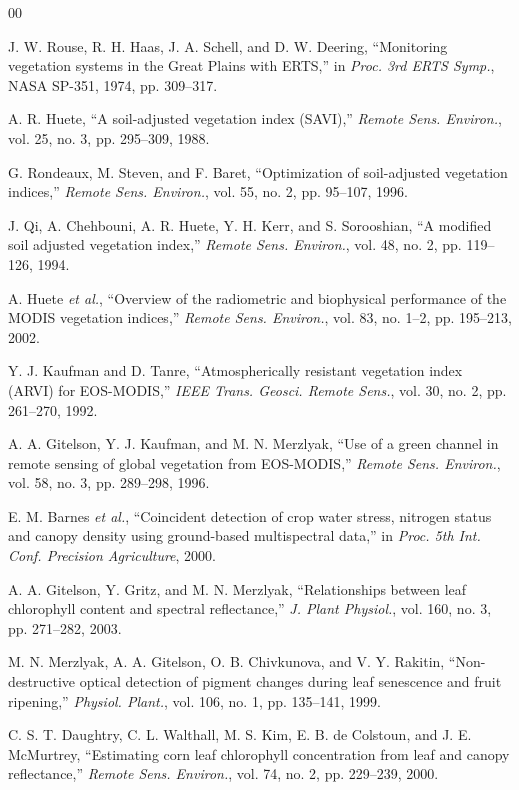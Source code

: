 \documentclass[conference]{IEEEtran}
\begin{document}
\begin{thebibliography}{00}

 J. W. Rouse, R. H. Haas, J. A. Schell, and D. W. Deering,
``Monitoring vegetation systems in the Great Plains with ERTS,'' in
\emph{Proc. 3rd ERTS Symp.}, NASA SP-351, 1974, pp. 309--317.

 A. R. Huete, ``A soil-adjusted vegetation index (SAVI),''
\emph{Remote Sens. Environ.}, vol. 25, no. 3, pp. 295--309, 1988.

 G. Rondeaux, M. Steven, and F. Baret, ``Optimization of
soil-adjusted vegetation indices,'' \emph{Remote Sens. Environ.}, vol. 55,
no. 2, pp. 95--107, 1996.

 J. Qi, A. Chehbouni, A. R. Huete, Y. H. Kerr, and
S. Sorooshian, ``A modified soil adjusted vegetation index,''
\emph{Remote Sens. Environ.}, vol. 48, no. 2, pp. 119--126, 1994.

 A. Huete \emph{et al.}, ``Overview of the radiometric and
biophysical performance of the MODIS vegetation indices,''
\emph{Remote Sens. Environ.}, vol. 83, no. 1--2, pp. 195--213, 2002.

 Y. J. Kaufman and D. Tanre, ``Atmospherically resistant
vegetation index (ARVI) for EOS-MODIS,'' \emph{IEEE Trans. Geosci. Remote
Sens.}, vol. 30, no. 2, pp. 261--270, 1992.

 A. A. Gitelson, Y. J. Kaufman, and M. N. Merzlyak, ``Use
of a green channel in remote sensing of global vegetation from EOS-MODIS,''
\emph{Remote Sens. Environ.}, vol. 58, no. 3, pp. 289--298, 1996.

 E. M. Barnes \emph{et al.}, ``Coincident detection of crop
water stress, nitrogen status and canopy density using ground-based
multispectral data,'' in \emph{Proc. 5th Int. Conf. Precision Agriculture},
2000.

 A. A. Gitelson, Y. Gritz, and M. N. Merzlyak,
``Relationships between leaf chlorophyll content and spectral reflectance,''
\emph{J. Plant Physiol.}, vol. 160, no. 3, pp. 271--282, 2003.

 M. N. Merzlyak, A. A. Gitelson, O. B. Chivkunova, and
V. Y. Rakitin, ``Non-destructive optical detection of pigment changes during
leaf senescence and fruit ripening,'' \emph{Physiol. Plant.}, vol. 106, no. 1,
pp. 135--141, 1999.

 C. S. T. Daughtry, C. L. Walthall, M. S. Kim,
E. B. de Colstoun, and J. E. McMurtrey, ``Estimating corn leaf chlorophyll
concentration from leaf and canopy reflectance,'' \emph{Remote Sens.
Environ.}, vol. 74, no. 2, pp. 229--239, 2000.


\end{thebibliography}
\end{document}
